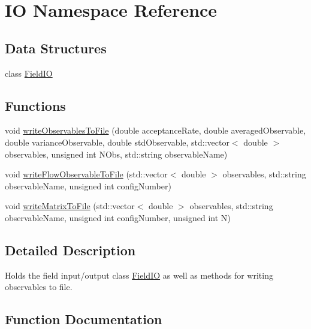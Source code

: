 \hypertarget{namespace_i_o}{}\section{IO Namespace Reference}
\label{namespace_i_o}
\subsection*{Data Structures}
\begin{DoxyCompactItemize}
\item 
class \mbox{\hyperlink{class_i_o_1_1_field_i_o}{Field\+IO}}
\end{DoxyCompactItemize}
\subsection*{Functions}
\begin{DoxyCompactItemize}
\item 
void \mbox{\hyperlink{namespace_i_o_ad8cf5aef8f60d10b80292b69a091d5ac}{write\+Observables\+To\+File}} (double acceptance\+Rate, double averaged\+Observable, double variance\+Observable, double std\+Observable, std\+::vector$<$ double $>$ observables, unsigned int N\+Obs, std\+::string observable\+Name)
\item 
void \mbox{\hyperlink{namespace_i_o_a4f554804fd2ccd9c13c73777c5cbbf77}{write\+Flow\+Observable\+To\+File}} (std\+::vector$<$ double $>$ observables, std\+::string observable\+Name, unsigned int config\+Number)
\item 
void \mbox{\hyperlink{namespace_i_o_ad77b7dd770afc8e2eb433d6187ea3616}{write\+Matrix\+To\+File}} (std\+::vector$<$ double $>$ observables, std\+::string observable\+Name, unsigned int config\+Number, unsigned int N)
\end{DoxyCompactItemize}


\subsection{Detailed Description}
Holds the field input/output class \mbox{\hyperlink{class_i_o_1_1_field_i_o}{Field\+IO}} as well as methods for writing observables to file. 

\subsection{Function Documentation}
\mbox{\label{namespace_i_o_a4f554804fd2ccd9c13c73777c5cbbf77}} 
